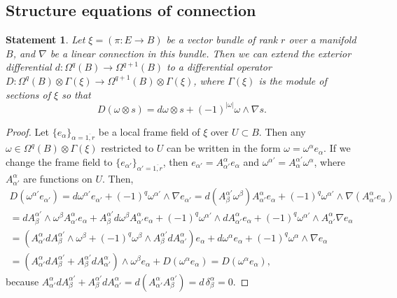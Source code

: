 \documentclass[12pt,letterpaper]{amsart}
\theoremstyle{definition}
\theoremstyle{plain}
\newtheorem{stat}{Statement}
\theoremstyle{remark}
\begin{document}
\subsection{Structure equations of connection}
\label{subsec:3_3}
\begin{stat}
Let $\xi = (\pi : E \to B)$ be a vector bundle of rank $r$ over a manifold $B$, and $\nabla$ be a linear connection in this bundle.
Then we can extend the exterior differential $d : \Omega^q(B) \to \Omega^{q + 1}(B)$ to a differential operator $D : \Omega^q(B) \otimes \Gamma(\xi) \to \Omega^{q + 1}(B) \otimes \Gamma(\xi)$, where $\Gamma(\xi)$ is the module of sections of $\xi$ so that
\begin{equation}
D(\omega \otimes s) = d\omega \otimes s + (-1)^{|\omega|} \omega \wedge \nabla s.
\label{eq:20}
\end{equation}
\label{stat:2}
\end{stat}
\begin{proof}
Let $\{e_\alpha\}_{\alpha = \overline{1, r}}$ be a local frame field of $\xi$ over $U \subset B$.
Then any $\omega \in \Omega^q(B) \otimes \Gamma(\xi)$ restricted to $U$ can be written in the form $\omega = \omega^\alpha e_\alpha$.
If we change the frame field to $\{e_{\alpha'}\}_{\alpha' = \overline{1, r}}$, then $e_{\alpha'} = A_{\alpha'}^\alpha e_\alpha$ and $\omega^{\alpha'} = A_{\alpha}^{\alpha'}\omega^\alpha$, where $A_{\alpha'}^\alpha$ are functions on $U$.
Then,
\begin{multline}
D(\omega^{\alpha'} e_{\alpha'}) = d\omega^{\alpha'} e_{\alpha'}+ (-1)^q \omega^{\alpha'} \wedge \nabla e_{\alpha'}
= d( A_\beta^{\alpha'} \omega^\beta ) A_{\alpha'}^\alpha e_\alpha + (-1)^q \omega^{\alpha'} \wedge \nabla (A_{\alpha'}^\alpha e_\alpha)
\\
= d A_\beta^{\alpha'} \wedge \omega^\beta A_{\alpha'}^\alpha e_\alpha+ A_\beta^{\alpha'} d\omega^\beta A_{\alpha'}^\alpha e_\alpha+ (-1)^q \omega^{\alpha'} \wedge dA_{\alpha'}^\alpha e_\alpha+ (-1)^q \omega^{\alpha'} \wedge A_{\alpha'}^\alpha \nabla e_\alpha
\\
= (A_{\alpha'}^\alpha d A_\beta^{\alpha'} \wedge \omega^\beta + (-1)^q \omega^{\beta} \wedge A_\beta^{\alpha'} dA_{\alpha'}^\alpha) e_\alpha+ d\omega^\alpha e_\alpha+ (-1)^q \omega^{\alpha} \wedge \nabla e_\alpha
\\
= (A_{\alpha'}^\alpha d A_\beta^{\alpha'} + A_\beta^{\alpha'} dA_{\alpha'}^\alpha) \wedge \omega^{\beta} e_\alpha + D(\omega^\alpha e_\alpha) = D(\omega^\alpha e_\alpha),
\label{eq:21}
\end{multline}
because $A_{\alpha'}^\alpha d A_\beta^{\alpha'} + A_\beta^{\alpha'} dA_{\alpha'}^\alpha = d( A_{\alpha'}^\alpha A_\beta^{\alpha'} ) = d \, \delta_\beta^\alpha = 0$.
\end{proof}
\end{document}
